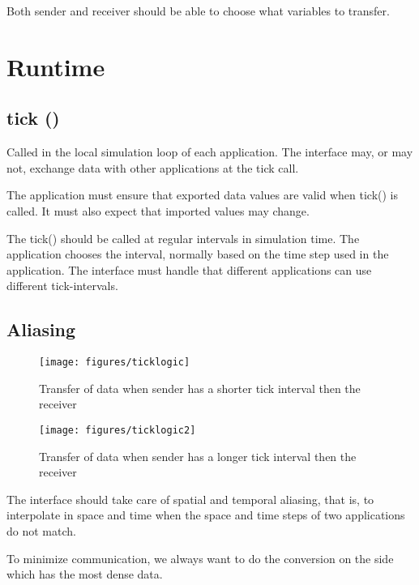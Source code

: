 \documentclass[a4paper]{report}
\begin{document}
Both sender and receiver should be able to choose what variables to
transfer.


\section{Runtime}

\subsection{tick ()}

Called in the local simulation loop of each application.
The interface may, or may not, exchange data with other applications
at the tick call.

The application must ensure that exported data values are valid when
tick() is called.  It must also expect that imported values may change.

The tick() should be called at regular intervals in simulation time.
The application chooses the interval, normally based on the time step
used in the application.  The interface must handle that different
applications can use different tick-intervals.


\subsection{Aliasing}

\begin{figure}
  \begin{center}
    \begin{minipage}{0.45\textwidth}
      \texttt{[image: figures/ticklogic]}
      \caption{Transfer of data when sender has a shorter
        tick interval then the receiver}
    \end{minipage}
    \hfill
    \begin{minipage}{0.45\textwidth}
      \texttt{[image: figures/ticklogic2]}
      \caption{Transfer of data when sender has a longer
        tick interval then the receiver}
    \end{minipage}
  \end{center}
\end{figure}

The interface should take care of spatial and temporal aliasing, that
is, to interpolate in space and time when the space and time steps of
two applications do not match.

To minimize communication, we always want to do the conversion on the
side which has the most dense data.
\end{document}
